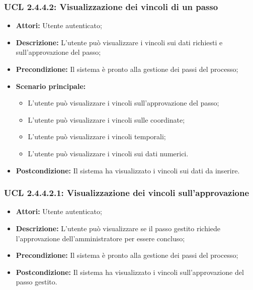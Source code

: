 \hypertarget{L2.4.4.2}{}
\subsubsection{UCL 2.4.4.2: Visualizzazione dei vincoli di un passo}
\begin{itemize}
\item \textbf{Attori:} Utente autenticato;
\item \textbf{Descrizione:} L'utente può visualizzare i vincoli sui dati richiesti e sull'approvazione del passo;
\item \textbf{Precondizione:} Il sistema è pronto alla gestione dei passi del processo;
\item \textbf{Scenario principale:}
\begin{itemize}
\item L'utente può visualizzare i vincoli sull'approvazione del passo;
\item L'utente può visualizzare i vincoli sulle coordinate;
\item L'utente può visualizzare i vincoli temporali;
\item L'utente può visualizzare i vincoli sui dati numerici.
\end{itemize}
\item \textbf{Postcondizione:} Il sistema ha visualizzato i vincoli sui dati da inserire.
\end{itemize}

\hypertarget{L2.4.4.2.1}{}
\subsubsection{UCL 2.4.4.2.1: Visualizzazione dei vincoli sull'approvazione}
\begin{itemize}
\item \textbf{Attori:} Utente autenticato;
\item \textbf{Descrizione:} L'utente può visualizzare se il passo gestito richiede l'approvazione dell'amministratore per essere concluso;
\item \textbf{Precondizione:} Il sistema è pronto alla gestione dei passi del processo;
\item \textbf{Postcondizione:} Il sistema ha visualizzato i vincoli sull'approvazione del passo gestito.
\end{itemize}

